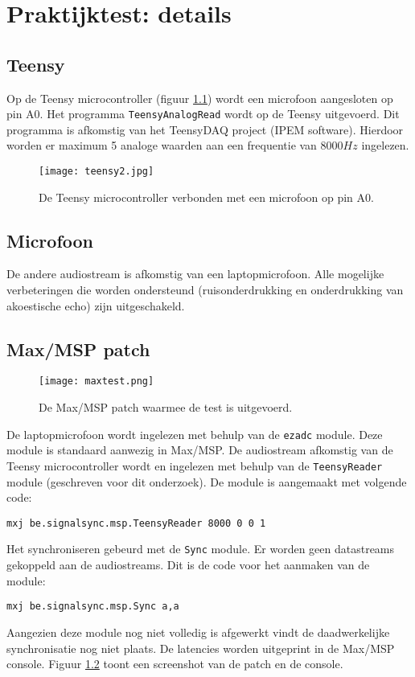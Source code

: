 \chapter{Praktijktest: details}
\label{appendix-e}

\section*{Teensy}

Op de Teensy microcontroller (figuur \ref{teensy-test}) wordt een microfoon aangesloten op pin A0. Het programma \texttt{TeensyAnalogRead} wordt op de Teensy uitgevoerd. Dit programma is afkomstig van het TeensyDAQ project (IPEM software). Hierdoor worden er maximum 5 analoge waarden aan een frequentie van $8000Hz$ ingelezen.

\begin{figure}[!h]
	\captionsetup{width=0.7\textwidth}
	\caption[Teensy testopstelling]{De Teensy microcontroller verbonden met een microfoon op pin A0.}
	\centering
	\advance\parskip0.3cm
	\texttt{[image: teensy2.jpg]}
	\label{teensy-test}
\end{figure}

\section*{Microfoon}

De andere audiostream is afkomstig van een laptopmicrofoon. Alle mogelijke verbeteringen die worden ondersteund (ruisonderdrukking en onderdrukking van akoestische echo) zijn uitgeschakeld.

\section*{Max/MSP patch}

\begin{figure}[!h]
	\captionsetup{width=0.7\textwidth}
	\caption[Max/MSP testopstelling]{De Max/MSP patch waarmee de test is uitgevoerd.}
	\centering
	\advance\parskip0.3cm
	\texttt{[image: maxtest.png]}
	\label{max-test}
\end{figure}

De laptopmicrofoon wordt ingelezen met behulp van de \texttt{ezadc\textapprox} module. Deze module is standaard aanwezig in Max/MSP. De audiostream afkomstig van de Teensy microcontroller wordt en ingelezen met behulp van de \texttt{TeensyReader} module (geschreven voor dit onderzoek). De module is aangemaakt met volgende code:
\begin{center}
	\texttt{mxj\textapprox\ be.signalsync.msp.TeensyReader 8000 0 0 1}
\end{center}
Het synchroniseren gebeurd met de \texttt{Sync} module. Er worden geen datastreams gekoppeld aan de audiostreams. Dit is de code voor het aanmaken van de module:
\begin{center}
	\texttt{mxj\textapprox\ be.signalsync.msp.Sync a,a}
\end{center}
Aangezien deze module nog niet volledig is afgewerkt vindt de daadwerkelijke synchronisatie nog niet plaats. De latencies worden uitgeprint in de Max/MSP console. Figuur \ref{max-test} toont een screenshot van de patch en de console.

